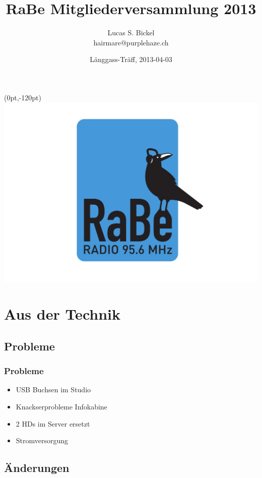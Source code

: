 \documentclass{beamer}
\title[RaBe Technik-Gruppe]{RaBe Mitgliederversammlung 2013}
\author{Lucas S. Bickel\\{ hairmare@purplehaze.ch}}
\institute[]{Radio Bern, Technik-Gruppe}
\date[DLT 2012]{L\"anggass-Tr\"aff, 2013-04-03}
\begin{document}
  \frame
  {

    \titlepage

    \begin{textblock*}{200pt}(0pt,-120pt)
      \scalebox{0.175}
      {
        \includegraphics[trim = 200pt 0pt 155pt 0pt,clip]{img/logo.png}
      }
    \end{textblock*}
  }

  \section*{Aus der Technik}

  \subsection*{Probleme}

  \frame
  {
    \frametitle{Probleme}
    
    \begin{itemize}
    \item{USB Buchsen im Studio}
    \item{Knackserprobleme Infokabine}
    \item{2 HDs im Server ersetzt}
    \item{Stromversorgung}
    \end{itemize}
  }

  \subsection*{\"Anderungen}

  \frame
  {
  }
\end{document}

